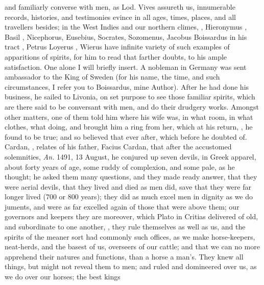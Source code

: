 and familiarly converse with men, as Lod. Vives assureth us, innumerable
records, histories, and testimonies evince in all ages, times, places, and
all travellers besides; in the West Indies and our
northern climes, , \etc{} Hieronymus
, Basil ,
Nicephorus, Eusebius, Socrates, Sozomenus, Jacobus
Boissardus in his tract ,
Petrus Loyerus , Wierus
 have infinite variety of such examples of
apparitions of spirits, for him to read that farther doubts, to his ample
satisfaction. One alone I will briefly insert. A nobleman in Germany was sent
ambassador to the King of Sweden (for his name, the time, and such
circumstances, I refer you to Boissardus, mine Author).
After he had done his business, he sailed to Livonia, on set purpose to see
those familiar spirits, which are there said to be conversant with men, and do
their drudgery works. Amongst other matters, one of them told him where his
wife was, in what room, in what clothes, what doing, and brought him a ring
from her, which at his return, , he found to be
true; and so believed that ever after, which before he doubted of. Cardan,
, relates of his father, Facius Cardan,
that after the accustomed solemnities, \emph{An.} 1491, 13 August, he conjured
up seven devils, in Greek apparel, about forty years of age, some ruddy of
complexion, and some pale, as he thought; he asked them many questions, and
they made ready answer, that they were aerial devils, that they lived and died
as men did, save that they were far longer lived (700 or 800
years); they did as much excel men in dignity as we do
juments, and were as far excelled again of those that were above them; our
governors and keepers they are moreover, which
Plato in Critias delivered of old, and subordinate to one
another, , they rule
themselves as well as us, and the spirits of the meaner sort had commonly such
offices, as we make horse-keepers, neat-herds, and the basest of us, overseers
of our cattle; and that we can no more apprehend their natures and functions,
than a horse a man's. They knew all things, but might not reveal them to men;
and ruled and domineered over us, as we do over our horses; the best kings

